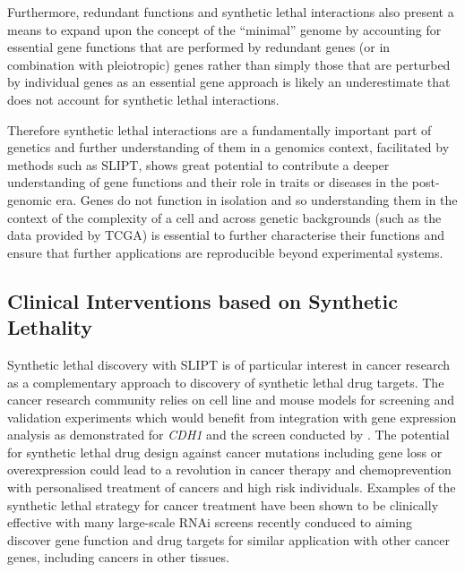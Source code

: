 Furthermore, redundant functions and synthetic lethal interactions also present a means to expand upon the concept of the ``minimal'' genome by accounting for essential gene functions that are performed by redundant genes (or in combination with pleiotropic) genes rather than simply those that are perturbed by individual genes as an essential gene approach is likely an underestimate that does not account for synthetic lethal interactions. 

Therefore synthetic lethal interactions are a fundamentally important part of genetics and further understanding of them in a genomics context, facilitated by methods such as \gls{SLIPT}, shows great potential to contribute a deeper understanding of gene functions and their role in traits or diseases in the post-genomic era. Genes do not function in isolation and so understanding them in the context of the complexity of a cell and across genetic backgrounds (such as the data provided by \gls{TCGA}) is essential to further characterise their functions and ensure that further applications are reproducible beyond experimental systems.


\subsection{Clinical Interventions based on Synthetic Lethality}
\label{chapt6:significance_clinic}

Synthetic lethal discovery with \gls{SLIPT} is of particular interest in cancer research as a complementary approach to discovery of synthetic lethal drug targets. The cancer research community relies on cell line and mouse models for screening and validation experiments \citep{Fece2015} which would benefit from integration with gene expression analysis as demonstrated for \textit{CDH1} and the screen conducted by \citet{Telford2015}. The potential for synthetic lethal drug design against cancer mutations including gene loss or overexpression could lead to a revolution in cancer therapy and chemoprevention with personalised treatment of cancers and high risk individuals.  Examples of the synthetic lethal strategy \citep{Farmer2005, Bryant2005} for cancer treatment have been shown to be clinically effective with many large-scale \acrshort{RNA}i screens recently conduced to aiming discover gene function and drug targets for similar application with other cancer genes, including cancers in other tissues.

